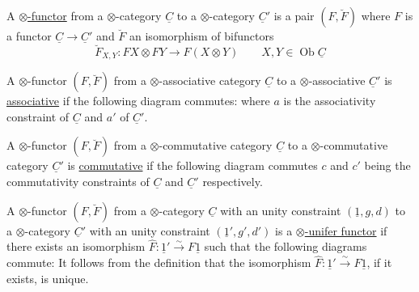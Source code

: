 A \uline{$\otimes$-functor} from a $\otimes$-category $\underline{C}$ to a $\otimes$-category $\underline{C}'$ is a pair $(F,\breve F)$ where $F$ is a functor $\underline{C}\longrightarrow\underline{C}'$ and $\breve F$ an isomorphism of bifunctors
\[
\breve F_{X,Y}:FX\otimes FY\longrightarrow F(X\otimes Y)\qquad X,Y\in\operatorname{Ob}\underline{C}
\]

A $\otimes$-functor $(F,\breve F)$ from a $\otimes$-associative category $\underline{C}$ to a $\otimes$-associative  $\underline{C}'$ is \uline{associative} if the following diagram commutes:
where $a$ is the associativity constraint of $\underline{C}$ and $a'$ of $\underline{C}'$.

A $\otimes$-functor $(F,\breve F)$ from a $\otimes$-commutative category $\underline{C}$ to a $\otimes$-commutative category $\underline{C}'$ is \uline{commutative} if the following diagram commutes
$c$ and $c'$ being the commutativity constraints of $\underline{C}$ and $\underline{C}'$ respectively.

A $\otimes$-functor $(F,\breve F)$ from a $\otimes$-category $\underline{C}$ with an unity constraint $(\underline{1},g,d)$ to a $\otimes$-category $\underline{C}'$ with an unity constraint $(\underline{1}',g',d')$ is a \uline{$\otimes$-unifer functor} if there exists an isomorphism $\hat F:\underline{1}'\xrightarrow{\sim}F\underline{1}$ such that the following diagrams commute:
It follows from the definition that the isomorphism $\hat F:\underline{1}'\xrightarrow{\sim}F\underline{1}$, if it exists, is unique.

